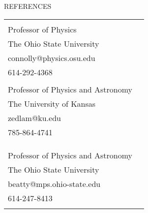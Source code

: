 \documentclass{resume} %
\begin{document}
\begin{rSection}{REFERENCES}

\begin{tabular}{lr}
\begin{minipage}[t]{2.5in}
{\bf Amy Connolly}\\
Professor of Physics\\
The Ohio State University\\
connolly@physics.osu.edu\\
614-292-4368\\
\end{minipage}
&
\begin{minipage}[t]{2.5in}
{\bf Dave Besson}\\
Professor of Physics and Astronomy\\
The University of Kansas\\
zedlam@ku.edu\\
785-864-4741\\
\end{minipage}
\\
\\ %
\begin{minipage}[t]{2.5in}
{\bf James Beatty}\\
Professor of Physics and Astronomy\\
The Ohio State University\\
beatty@mps.ohio-state.edu\\
614-247-8413\\
\end{minipage}
\end{tabular}

\end{rSection}
\end{document}
